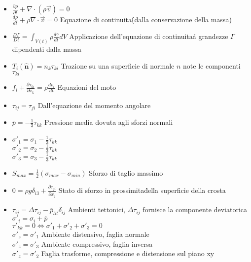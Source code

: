 \documentclass[a4paper]{article}
\begin{document}
\begin{itemize}
	\item $\frac{\partial \rho}{\partial t} + \nabla \cdot (\rho \overrightarrow{v}) = 0$ \\
	$\frac{d \rho}{d t} + \rho \nabla \cdot \overrightarrow{v} = 0$  \hspace{0.3cm} Equazione di continuita\' (dalla conservazione della massa)
	
	\item $\frac{D \Gamma}{Dt}= \int_{V(t)} \rho \frac{d \gamma}{dt} dV $ Applicazione dell'equazione di continuita\' a grandezze $ \Gamma$ dipendenti dalla massa
	
	\item $T_i(\hat{\textbf{n}})=n_k \tau_{ki}$ Trazione su una superficie di normale $n$ note le componenti $\tau_{ki}$
	
	\item $f_i + \frac{\partial \tau_{ki}}{\partial x_k} = \rho \frac{dv_i}{dt}$ Equazioni del moto
	
	\item $\tau_{ij} = \tau_{ji}$ Dall'equazione del momento angolare
	
	\item $\overline{p}=-\frac{1}{3}\tau_{kk}$ Pressione media dovuta agli sforzi normali
	
	\item $\sigma'_1=\sigma_1-\frac{1}{3}\tau_{kk}$\\
	$\sigma'_2=\sigma_2-\frac{1}{3}\tau_{kk}$\\
	$\sigma'_3=\sigma_3-\frac{1}{3}\tau_{kk}$\\
	
	\item $S_{max}=\frac{1}{2}(\sigma_{max}-\sigma_{min})$ Sforzo di taglio massimo
	
	\item $0=\rho g \delta_{i3}+ \frac{\partial \tau_{ji}}{\partial x_j}$ Stato di sforzo in prossimita\' della superficie della crosta
	
	\item $\tau_{ij} = \Delta \tau_{ij}-\overline{p}_{lit} \delta_{ij}$ Ambienti tettonici, $\Delta \tau_{ij}$ fornisce la componente deviatorica\\
	$\sigma'_i=\sigma_i+\overline{p}$\\
	$\tau'_{kk}=0 \iff \sigma'_1 + \sigma'_2 +\sigma'_3 =0$\\
	$\sigma'_z=\sigma'_1$ Ambiente distensivo, faglia normale\\
	$\sigma'_z=\sigma'_3$ Ambiente compressivo, faglia inversa\\
	$\sigma'_z=\sigma'_2$ Faglia trasforme, compressione e distensione sul piano xy\\
	

\end{itemize}
\end{document}
